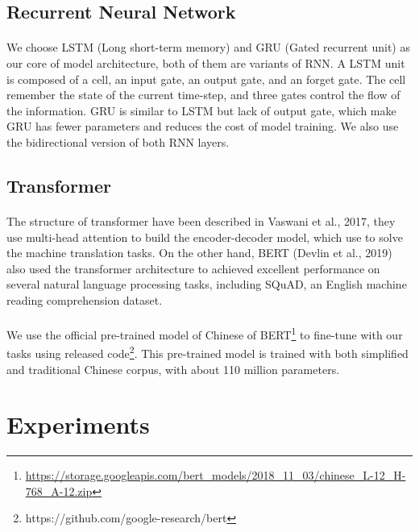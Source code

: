 \documentclass{article}
\begin{document}
\subsection{Recurrent Neural Network}
\paragraph{}
We choose LSTM\cite{hochreiter1997lstm} (Long short-term memory) and GRU\cite{cho2014learning} (Gated recurrent unit) as our core of model architecture, both of them are variants of RNN. A LSTM unit is composed of a cell, an input gate, an output gate, and an forget gate. The cell remember the state of the current time-step, and three gates control the flow of the information. GRU is similar to LSTM but lack of output gate, which make GRU has fewer parameters and reduces the cost of model training. We also use the bidirectional version of both RNN layers.

\subsection{Transformer}
\paragraph{}
The structure of transformer\cite{vaswani2017attention} have been described in Vaswani et al., 2017, they use multi-head attention to build the encoder-decoder model, which use to solve the machine translation tasks. On the other hand, BERT\cite{devlin2018bert} (Devlin et al., 2019) also used the transformer architecture to achieved excellent performance on several natural language processing tasks, including SQuAD, an English machine reading comprehension dataset.

\paragraph{}
We use the official pre-trained model of Chinese of BERT\footnote{\url{https://storage.googleapis.com/bert_models/2018_11_03/chinese_L-12_H-768_A-12.zip}} to fine-tune with our tasks using released code\footnote{\label{run_squad}https://github.com/google-research/bert}. This pre-trained model is trained with both simplified and traditional Chinese corpus, with about 110 million parameters.

\section{Experiments}
\end{document}
